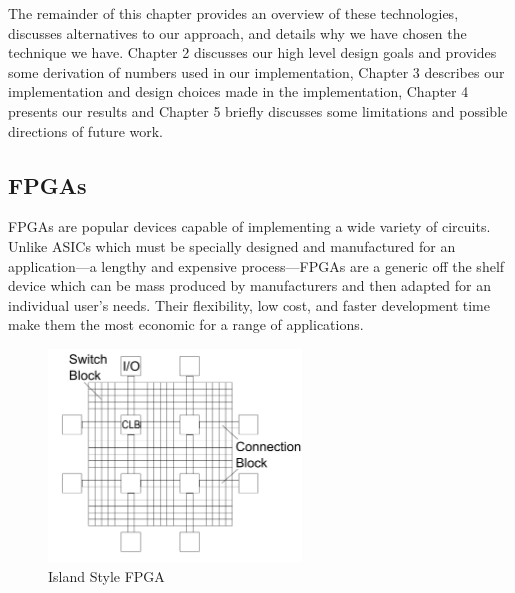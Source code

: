 \documentclass[12pt,final,oneside]{dwThesis} %
\begin{document}
   The remainder of this chapter provides an overview of
   these technologies, discusses alternatives to our approach, and details why
   we have chosen the technique we have. Chapter 2 discusses our high level design goals and provides some derivation of numbers used in our implementation,
   Chapter 3 describes our implementation and design choices made
   in the implementation,
   Chapter 4 presents our results and
   Chapter 5 briefly discusses some limitations and possible directions of future work.
   \glsresetall
   \subsection{\glspl{FPGA}
   } \glspl{FPGA} are popular devices
   capable of implementing a wide variety of circuits. Unlike \glspl{ASIC}
   which must be specially designed and manufactured for an application---a
   lengthy and expensive process---\glspl{FPGA} are a generic off the shelf
   device which can be mass produced by manufacturers and then adapted for an
   individual user's needs. Their flexibility, low cost, and faster development
   time make them the most economic for a range of applications.


   \begin{figure}

      \begin{center}

         \includegraphics[width=0.6\textwidth]{images/ArchFull.pdf}
         \caption{Island Style FPGA} \label{FPGAArch} 
      \end{center}

   \end{figure}
\end{document}
